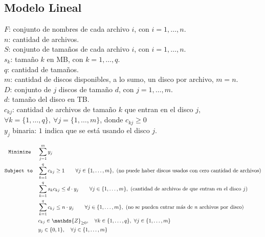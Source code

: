 \documentclass[11pt, a4paper, pdftex]{article}
\begin{document}
\subsection{Modelo Lineal}

$F$: conjunto de nombres de cada archivo $i$, con $i = 1, \ldots, n$. \\

$n$: cantidad de archivos. \\

$S$: conjunto de tamaños de cada archivo $i$, con $i = 1, \ldots, n$. \\

$s_{k}$: tamaño $k$ en MB, con $k = 1, \ldots, q$. \\

$q$: cantidad de tamaños. \\

$m$: cantidad de discos disponibles, a lo sumo, un disco por archivo, $m = n$. \\

$D$: conjunto de $j$ discos de tamaño $d$, con $j = 1, \ldots, m$. \\

$d$: tamaño del disco en TB. \\ 

$c_{kj}$: cantidad de archivos de tamaño $k$ que entran en el disco $j$, $\forall k = \{1, \ldots, q\},\ \forall j = \{1, \ldots, m\}$, donde $c_{kj} \ge 0$\\

$y_{j}$ binaria: $1$ indica que se está usando el disco $j$.

\begin{alignat*}{2}
	\minimize
	& \sum_{j = 1}^{m} y_{j}\\
	\subjto
	& \sum_{k = 1}^{q} c_{kj} \ge 1 \qquad \forall j \in \{1, \ldots, m\},\ \text{(no puede haber discos usados con cero cantidad de archivos)}\\
	& \sum_{k = 1}^{q} s_{k} c_{kj} \le d\cdot y_{j} \qquad \forall j \in \{1, \ldots, m\},\ \text{(cantidad de archivos de que entran en el disco $j$)}\\
	& \sum_{k = 1}^{q} c_{kj} \le n\cdot y_{j} \qquad \forall j \in \{1, \ldots, m\},\ \text{(no se pueden entrar más de $n$ archivos por disco)}\\
	& c_{kj} \in \mathds{Z}_{\ge 0}, \quad \forall k \in \{1, \ldots, q\}, \ \forall j \in \{1, \ldots, m\}\\
	& y_{j} \in \{0,1\}, \quad \forall j \in \{1, \ldots, m\}
\end{alignat*}
\end{document}
